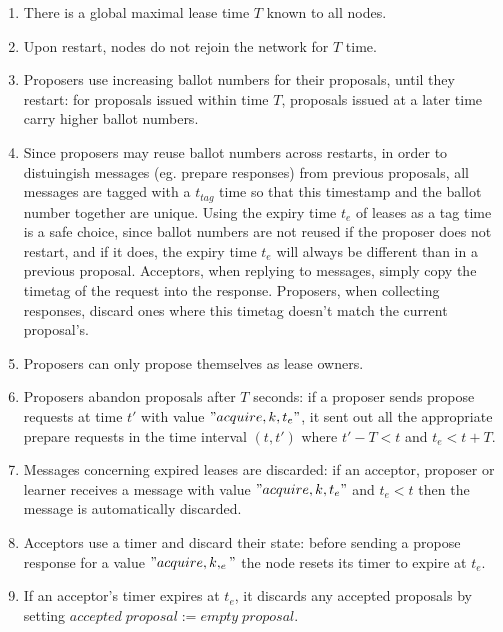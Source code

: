 \documentclass[12pt]{article}
\begin{document}
\begin{enumerate}
\item There is a global maximal lease time $T$ known to all nodes.

\item Upon restart, nodes do not rejoin the network for $T$ time.

\item Proposers use increasing ballot numbers for their proposals, until they restart: for proposals issued within time $T$, proposals issued at a later time carry higher ballot numbers.

\item Since proposers may reuse ballot numbers across restarts, in order to distuingish messages (eg. prepare responses) from previous proposals, all messages are tagged with a $t_{tag}$ time so that this timestamp and the ballot number together are unique. Using the expiry time $t_e$ of leases as a tag time is a safe choice, since ballot numbers are not reused if the proposer does not restart, and if it does, the expiry time $t_e$ will always be different than in a previous proposal. Acceptors, when replying to messages, simply copy the timetag of the request into the response. Proposers, when collecting responses, discard ones where this timetag doesn't match the current proposal's.

\item Proposers can only propose themselves as lease owners.

\item Proposers abandon proposals after $T$ seconds: if a proposer sends propose requests at time $t'$ with value $"acquire, k, t_e"$, it sent out all the appropriate prepare requests in the time interval $(t, t')$ where $t' - T < t$ and $t_e < t + T$.

\item Messages concerning expired leases are discarded: if an acceptor, proposer or learner receives a message with value $"acquire, k, t_e"$ and $t_e < t$ then the message is automatically discarded.

\item Acceptors use a timer and discard their state: before sending a propose response for a value $"acquire, k, _e"$ the node resets its timer to expire at $t_e$.

\item If an acceptor's timer expires at $t_e$, it discards any accepted proposals by setting $accepted \; proposal := empty \; proposal$.

\end{enumerate}
\end{document}
